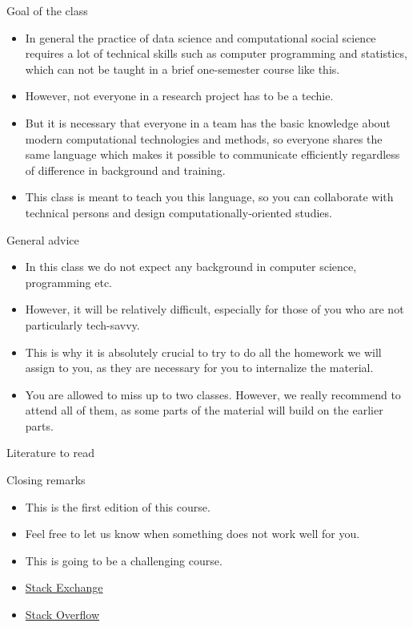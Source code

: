 \begin{frame}{Goal of the class}
\begin{itemize}
    \item In general the practice of data science and computational social science
    requires a lot of technical skills such as computer programming and statistics,
    which can not be taught in a brief one-semester course like this.
    \item However, not everyone in a research project has to be a techie.
    \item But it is necessary that everyone in a team has the basic knowledge
    about modern computational technologies and methods, so everyone shares
    the same language which makes it possible to communicate efficiently regardless
    of difference in background and training.
    \item This class is meant to teach you this language, so you can
    collaborate with technical persons and design computationally-oriented
    studies.
\end{itemize}
\end{frame}

\begin{frame}{General advice}
\begin{itemize}
    \item In this class we do not expect any background in computer science,
    programming etc.
    \item However, it will be relatively difficult, especially for those of you
    who are not particularly tech-savvy.
    \item This is why it is absolutely crucial to try to do all the homework
    we will assign to you, as they are necessary for you to internalize
    the material.
    \item You are allowed to miss up to two classes. However, we really recommend
    to attend all of them, as some parts of the material will build on the
    earlier parts.
\end{itemize}
\end{frame}

\begin{frame}{Literature to read}
\nocite{*}
\AtNextBibliography{\footnotesize}
\printbibliography
\end{frame}

\begin{frame}{Closing remarks}
\begin{itemize}
    \item This is the first edition of this course.
    \item Feel free to let us know when something does not work well for you.
    \item This is going to be a challenging course.
    \item \href{www.stackexchange.com}{Stack Exchange}
    \item \href{www.stackoverflow.com}{Stack Overflow}
\end{itemize}
\end{frame}
